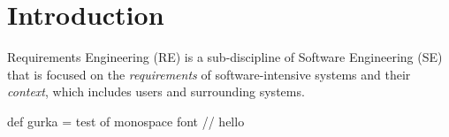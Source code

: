 

\chapter{Introduction}%
%
Requirements Engineering (RE) is a sub-discipline of Software Engineering (SE) that is focused on the \textit{requirements} of software-intensive systems and their \textit{context}, which includes users and surrounding systems.%
\begin{Code}[language=scala, basicstyle=\normalsize\ttfamily\selectfont]
  def gurka = test of monospace font
  // hello
\end{Code}
%  
